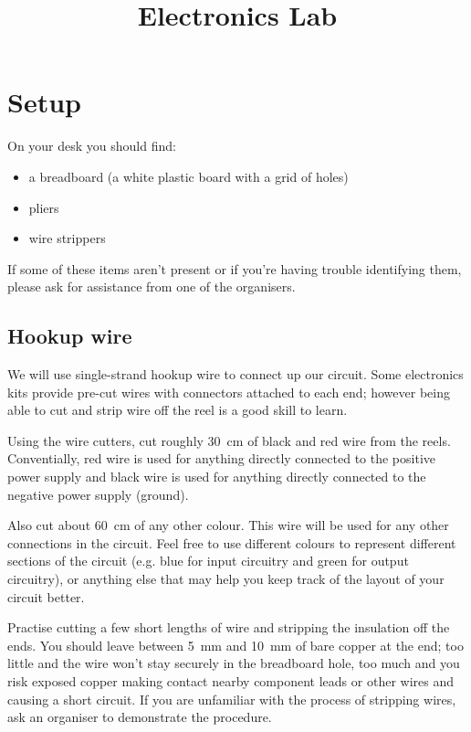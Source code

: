 \documentclass{article}
\title{Electronics Lab}
\begin{document}
\maketitle


\section{Setup}

On your desk you should find:

\begin{itemize}
\item a breadboard (a white plastic board with a grid of holes)
\item pliers
\item wire strippers
\end{itemize}

If some of these items aren't present or if you're having trouble identifying
them, please ask for assistance from one of the organisers.

\subsection{Hookup wire}

We will use single-strand hookup wire to connect up our circuit. Some
electronics kits provide pre-cut wires with connectors attached to each end;
however being able to cut and strip wire off the reel is a good skill to learn.

Using the wire cutters, cut roughly \SI{30}{\centi\metre} of black and red wire
from the reels. Conventially, red wire is used for anything directly connected
to the positive power supply and black wire is used for anything directly
connected to the negative power supply (ground).

Also cut about \SI{60}{\centi\metre} of any other colour. This wire will be used
for any other connections in the circuit. Feel free to use different colours to
represent different sections of the circuit (e.g. blue for input circuitry and
green for output circuitry), or anything else that may help you keep track of
the layout of your circuit better.

Practise cutting a few short lengths of wire and stripping the insulation off
the ends. You should leave between \SI{5}{\milli\metre} and
\SI{10}{\milli\metre} of bare copper at the end; too little and the wire won't
stay securely in the breadboard hole, too much and you risk exposed copper
making contact nearby component leads or other wires and causing a short
circuit. If you are unfamiliar with the process of stripping wires, ask an
organiser to demonstrate the procedure.
\end{document}
